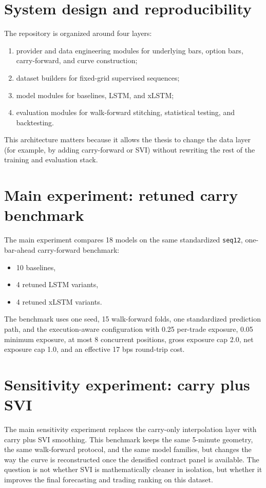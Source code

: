 \documentclass[12pt]{report}
\newcommand{\code}[1]{\texttt{#1}}
\begin{document}
\section{System design and reproducibility}
The repository is organized around four layers:
\begin{enumerate}[leftmargin=1.2cm]
    \item provider and data engineering modules for underlying bars, option bars, carry-forward, and curve construction;
    \item dataset builders for fixed-grid supervised sequences;
    \item model modules for baselines, LSTM, and xLSTM;
    \item evaluation modules for walk-forward stitching, statistical testing, and backtesting.
\end{enumerate}

This architecture matters because it allows the thesis to change the data layer (for example, by adding carry-forward or SVI) without rewriting the rest of the training and evaluation stack.

\section{Main experiment: retuned carry benchmark}
The main experiment compares 18 models on the same standardized \code{seq12}, one-bar-ahead carry-forward benchmark:
\begin{itemize}[leftmargin=1.2cm]
    \item 10 baselines,
    \item 4 retuned LSTM variants,
    \item 4 retuned xLSTM variants.
\end{itemize}

The benchmark uses one seed, 15 walk-forward folds, one standardized prediction path, and the execution-aware configuration with 0.25 per-trade exposure, 0.05 minimum exposure, at most 8 concurrent positions, gross exposure cap 2.0, net exposure cap 1.0, and an effective 17 bps round-trip cost.

\section{Sensitivity experiment: carry plus SVI}
The main sensitivity experiment replaces the carry-only interpolation layer with carry plus SVI smoothing. This benchmark keeps the same 5-minute geometry, the same walk-forward protocol, and the same model families, but changes the way the curve is reconstructed once the densified contract panel is available. The question is not whether SVI is mathematically cleaner in isolation, but whether it improves the final forecasting and trading ranking on this dataset.
\end{document}

